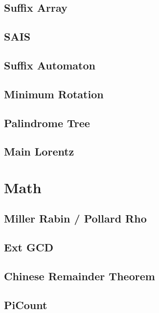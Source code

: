 \subsection{Suffix Array}
\subsection{SAIS}
\subsection{Suffix Automaton}

\subsection{Minimum Rotation}
\subsection{Palindrome Tree}

\subsection{Main Lorentz}

\section{Math}
% 
\subsection{Miller Rabin / Pollard Rho}
\subsection{Ext GCD}

\subsection{Chinese Remainder Theorem}

\subsection{PiCount}

